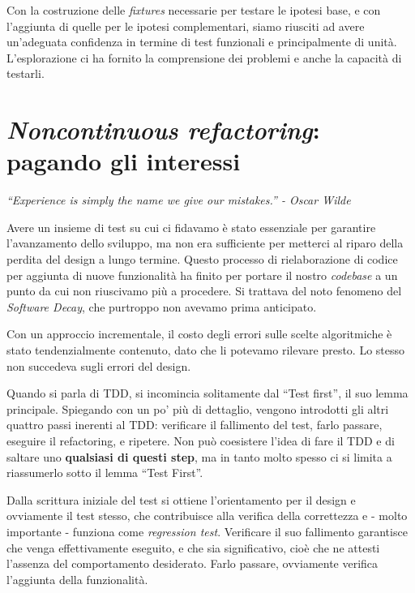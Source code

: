 \documentclass[12pt]{report}
\begin{document}
Con la costruzione delle \textit{fixtures} necessarie per testare
le ipotesi base, e con l'aggiunta di quelle per le ipotesi complementari,
siamo riusciti ad avere un'adeguata confidenza in termine di 
test funzionali e principalmente di unità. L'esplorazione ci 
ha fornito la comprensione dei
problemi e anche la capacità di testarli.

\section{\textit{Noncontinuous refactoring}: pagando gli interessi}

\vspace{3mm}
\begin{flushright}
\textit{``Experience is simply the name we give our mistakes.'' - Oscar Wilde}
\end{flushright}
\vspace{8mm}

Avere un insieme di test su cui ci fidavamo è stato essenziale per
garantire l'avanzamento dello sviluppo, ma
non era sufficiente per metterci al riparo della perdita del
design a lungo termine. Questo processo di rielaborazione di 
codice per aggiunta di nuove funzionalità ha finito per portare 
il nostro \textit{codebase} a un punto da cui non riuscivamo più a procedere.
Si trattava del noto fenomeno del \textit{Software Decay}, che purtroppo
non avevamo prima anticipato.

Con un approccio incrementale, il costo degli errori sulle scelte
algoritmiche è stato tendenzialmente contenuto, dato che li potevamo
rilevare presto. Lo stesso non succedeva sugli errori del design.

Quando si parla di TDD, si incomincia solitamente dal ``Test first'', 
il suo lemma principale. Spiegando con un po' più di dettaglio, vengono 
introdotti gli altri quattro passi inerenti al TDD: verificare il 
fallimento del test, farlo passare, eseguire il refactoring, e ripetere. 
Non può coesistere l'idea di fare il TDD e di saltare uno 
\textbf{qualsiasi di questi step}, ma in tanto molto spesso ci si limita
a riassumerlo sotto il lemma ``Test First''. 

Dalla scrittura iniziale del test si ottiene l'orientamento per il design 
e ovviamente il test stesso, che contribuisce alla verifica della correttezza
e - molto importante - funziona come \textit{regression test}.
Verificare il suo fallimento garantisce che venga effettivamente eseguito, 
e che sia significativo, cioè che ne attesti l'assenza del
comportamento desiderato. Farlo passare, ovviamente verifica
l'aggiunta della funzionalità. 
\end{document}
